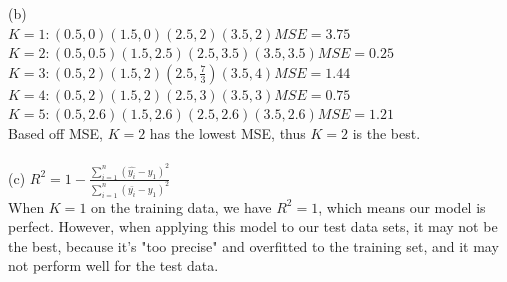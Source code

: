 \documentclass[12pt, letterpaper]{report}
\newcommand\tab[1][1cm]{\hspace*{#1}}
\begin{document}
\indent (b)\\
\tab $K = 1: (0.5, 0) (1.5, 0) (2.5, 2) (3.5, 2) MSE = 3.75$\\
\tab $K = 2: (0.5, 0.5) (1.5, 2.5) (2.5, 3.5) (3.5, 3.5) MSE = 0.25$\\
\tab $K = 3: (0.5, 2) (1.5, 2) (2.5, \frac{7}{3}) (3.5, 4) MSE = 1.44$\\
\tab $K = 4: (0.5, 2) (1.5, 2) (2.5, 3) (3.5, 3) MSE = 0.75$\\
\tab $K = 5: (0.5, 2.6) (1.5, 2.6) (2.5, 2.6) (3.5, 2.6) MSE = 1.21$\\
Based off MSE, $K = 2$ has the lowest MSE, thus $K = 2$ is the best.
\\\\
\indent (c) $R^2 = 1 - \frac{\sum_{i=1}^{n} (\hat{y_i} - y_1)^2}{\sum_{i=1}^{n} (\bar{y_i} - y_1)^2}$\\
When $K = 1$ on the training data, we have $R^2 = 1$, which means our model is perfect. However, when applying this model to our test data sets, it may not be the best, because it's "too precise" and overfitted to the training set, and it may not perform well for the test data.
\end{document}
